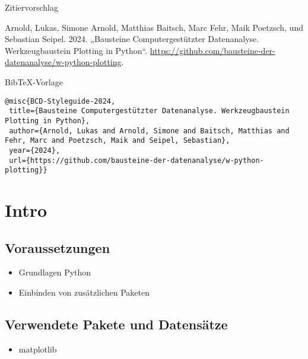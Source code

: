 \documentclass[
  letterpaper,
  DIV=11,
  numbers=noendperiod]{scrreprt}
\providecommand{\tightlist}{%
  \setlength{\itemsep}{0pt}\setlength{\parskip}{0pt}}\usepackage{longtable,booktabs,array}
\begin{document}
\begin{tcolorbox}
\begin{figure}
\end{figure}%

Zitiervorschlag

Arnold, Lukas, Simone Arnold, Matthias Baitsch, Marc Fehr, Maik
Poetzsch, und Sebastian Seipel. 2024. „Bausteine Computergestützter
Datenanalyse. Werkzeugbaustein Plotting in Python``.
\url{https://github.com/bausteine-der-datenanalyse/w-python-plotting}.

BibTeX-Vorlage

\begin{verbatim}
@misc{BCD-Styleguide-2024,
 title={Bausteine Computergestützter Datenanalyse. Werkzeugbaustein Plotting in Python},
 author={Arnold, Lukas and Arnold, Simone and Baitsch, Matthias and Fehr, Marc and Poetzsch, Maik and Seipel, Sebastian},
 year={2024},
 url={https://github.com/bausteine-der-datenanalyse/w-python-plotting}} 
\end{verbatim}

\chapter*{Intro}\label{intro-1}


\section*{Voraussetzungen}\label{voraussetzungen-2}


\begin{itemize}
\tightlist
\item
  Grundlagen Python
\item
  Einbinden von zusätzlichen Paketen
\end{itemize}

\section*{Verwendete Pakete und
Datensätze}\label{verwendete-pakete-und-datensuxe4tze-1}


\begin{itemize}
\tightlist
\item
  matplotlib
\end{itemize}


\end{tcolorbox}
\end{document}
